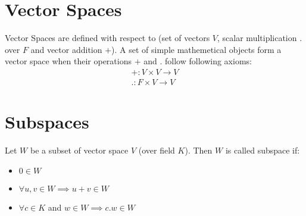 \documentclass[12pt]{article}
\begin{document}
	\section {Vector Spaces}
		Vector Spaces are defined with respect to (set of vectors $V$, scalar multiplication $.$ over $F$ and vector addition $+$). A set of simple mathemetical objects form a vector space when their operations $+$ and $.$ follow following axioms:
		\begin{gather*}
			+: V \times V \rightarrow V \\
			.: F \times V \rightarrow V 
		\end{gather*}
		\begin{table}[H]
			\centering
			\caption{Vector Space Properties}
			\label{my-label}
		\end{table}
		
	\section {Subspaces}
	Let $W$ be a subset of vector space $V$ (over field $K$). Then $W$ is called subspace if:
	\begin{itemize}
		\item {$0 \in W$}
		\item {$\forall u,v \in W \implies u+v \in W$}
		\item {$\forall c \in K$ and $w \in W \implies c.w \in W$}
	\end{itemize}
\end{document}
